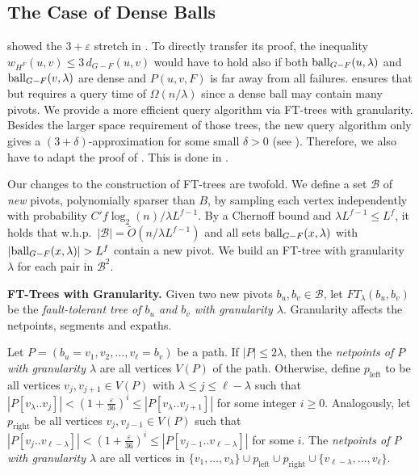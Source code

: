 \documentclass{article}\usepackage[a4paper,margin=20mm]{geometry}
\newcommand*{\B}{\mathcal{B}}
\newcommand*{\Otilde}{\widetilde{O}}
\newcommand*{\length}[1]{|#1|}
\newcommand*{\ball}{\mbox{\rm ball}}
\renewcommand{\leq}{\leqslant}
\renewcommand{\le}{\leqslant}
\renewcommand{\ge}{\geqslant}
\newcommand{\eps}{\varepsilon}
\begin{document}
\subsection{The Case of Dense Balls}
\label{subsec:improved_query_dense}

 showed the $3+\varepsilon$ stretch in .
To directly transfer its proof, the inequality $w_{H^F}(u,v) \le 3 \, d_{G-F}(u,v)$ would have to hold
also if both $\ball_{G-F}(u,\lambda)$ and $\ball_{G-F}(v,\lambda)$ are dense
and $P(u,v,F)$ is far away from all failures.
 ensures that but requires a query time of $\Omega(n/\lambda)$
since a dense ball may contain many pivots. 
We provide a more efficient query algorithm via FT-trees with granularity.
Besides the larger space requirement of those trees,
the new query algorithm only gives a $(3{+}\delta)$-approximation for some small $\delta > 0$ (see ).
Therefore, we also have to adapt the proof of .
This is done in .

Our changes to the construction of FT-trees are twofold.
We define a set $\B$  of \emph{new} pivots,
polynomially sparser than $B$, by sampling each vertex independently with probability 
$C' f\log_2(n)/\lambda L^{f-1}$.
By a Chernoff bound and $\lambda L^{f-1} \le L^f$, 
it holds that w.h.p.\ $|\B| = \Otilde(n/\lambda L^{f-1})$ and
all sets $\ball_{G-F}(x,\lambda)$ with $|\ball_{G-F}(x,\lambda)| > L^f$
contain a new pivot.
We build an FT-tree with granularity $\lambda$ for each pair in $\B^2$.
\vspace*{.5em}

\noindent
\textbf{FT-Trees with Granularity.}
Given two new pivots $b_u,b_v \in \B$, let $FT_\lambda(b_u,b_v)$ be the \emph{fault-tolerant tree of $b_u$ and $b_v$ with granularity $\lambda$}. 
Granularity affects the netpoints, segments and expaths.

\begin{definition}
\label{def:dense_netpoint}
  Let $P = (b_u = v_1, v_2, \ldots, v_\ell= b_v)$ be a path.
  If $|P| \leq 2\lambda$, then the \emph{netpoints of $P$ with granularity $\lambda$}
  are all vertices $V(P)$ of the path.
  Otherwise, define $p_{\text{left}}$ to be all vertices $v_j,v_{j+1} \in V(P)$ 
  with $\lambda \le j \le \ell-\lambda$ 
  such that $\length{P[v_\lambda..v_j]} < (1{+}\frac{\eps}{36})^i \le \length{P[v_\lambda..v_{j+1}]}$
  for some integer $i \ge 0$.
  Analogously, let $p_{\text{right}}$ be all vertices $v_j,v_{j-1} \in V(P)$ 
  such that $\length{P[v_j..v_{\ell-\lambda}]} < (1{+}\frac{\eps}{36})^i \le \length{P[v_{j-1}..v_{\ell-\lambda}]}$
  for some $i$.
  The \emph{netpoints of P with granularity $\lambda$} are all vertices in
  $\{v_1,\ldots,v_{\lambda}\} \cup p_{\text{left}} \cup p_{\text{right}} 
  	\cup \{v_{\ell-\lambda},\ldots, v_\ell\}$.
\end{definition}
\end{document}

